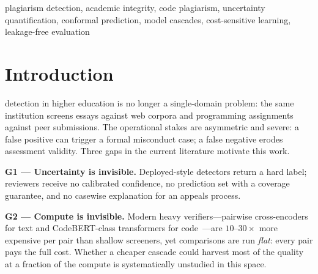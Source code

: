 \documentclass[conference]{IEEEtran}
\newcommand{\fone}{F_{1}}
\begin{document}
\begin{abstract}
three ways: (i) at matched recall (iso-recall), the framework exceeds \emph{every} peer on
$\fone$ and MCC; (ii) at matched verification cost (iso-cost), its routing frontier dominates
all budget-conscious peers; and (iii) in a cost-unconstrained configuration it attains the highest
code $\fone$ ($0.8481$) and MCC ($0.6997$) of all nine systems, significantly outperforming four of
five code peers (McNemar and clustered-bootstrap tests) and matching the strongest peer within
statistical indistinguishability---while adversarial augmentation raises its resilience to
systematic identifier-renaming attacks from a $33$-point recall collapse to a $0.6$-point one, and
to paraphrase attacks with the top $\fone$ under six of seven attack families.
We report costs honestly: eschewing precision rhetoric, routing saves $61\%$ (text) and $27\%$
(code) of heavy-verifier invocations for within-$\epsilon$ MCC. Group-conformal coverage lands at
$93.0\%$ vs.\ the $95\%$ target (Wilson $95\%$ CI $[0.913, 0.944]$)---we analyze this mixed,
under-coverage result rather than hiding it. The framework therefore offers a defensible
accuracy--cost--uncertainty envelope for institutional deployment.
\end{abstract}

\begin{IEEEkeywords}
plagiarism detection, academic integrity, code plagiarism, uncertainty quantification,
conformal prediction, model cascades, cost-sensitive learning, leakage-free evaluation
\end{IEEEkeywords}

\section{Introduction}
 detection in higher education is no longer a single-domain problem:
the same institution screens essays against web corpora and programming assignments against peer
submissions. The operational stakes are asymmetric and severe: a false positive can trigger a
formal misconduct case; a false negative erodes assessment validity. Three gaps in the current
literature motivate this work.

\textbf{G1 --- Uncertainty is invisible.} Deployed-style detectors return a hard label; reviewers
receive no calibrated confidence, no prediction set with a coverage guarantee, and no casewise
explanation for an appeals process.

\textbf{G2 --- Compute is invisible.} Modern heavy verifiers---pairwise cross-encoders for text
and CodeBERT-class transformers for code~\cite{reimers2019,feng2020}---are $10$--$30\times$ more
expensive per pair than shallow screeners, yet comparisons are run \emph{flat}: every pair pays the
full cost. Whether a cheaper cascade could harvest most of the quality at a fraction of the compute
is systematically unstudied in this space.
\end{document}
